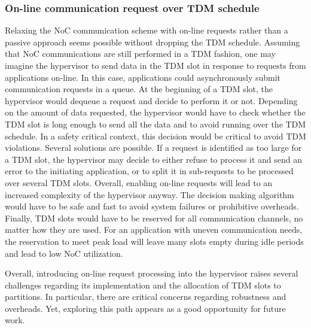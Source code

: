 \documentclass[main.tex]{subfiles}
\begin{document}
\subsubsection{On-line communication request over TDM schedule} Relaxing the
NoC communication scheme with on-line requests rather than a passive approach
seems possible without dropping the TDM schedule. Assuming that NoC
communications are still performed in a TDM fashion, one may imagine the
hypervisor to send data in the TDM slot in response to requests from
applications on-line. In this case, applications could asynchronously submit
communication requests in a queue. At the beginning of a TDM slot, the
hypervisor would dequeue a request and decide to perform it or not. Depending
on the amount of data requested, the hypervisor would have to check whether the
TDM slot is long enough to send all the data and to avoid running over the TDM
schedule. In a safety critical context, this decision would be critical to
avoid TDM violations. Several solutions are possible. If a request is
identified as too large for a TDM slot, the hypervisor may decide to either
refuse to process it and send an error to the initiating application, or to
split it in sub-requests to be processed over several TDM slots. Overall,
enabling on-line requests will lead to an increased complexity of the
hypervisor anyway. The decision making algorithm would have to be safe and fast
to avoid system failures or prohibitive overheads.  Finally, TDM slots would
have to be reserved for all communication channels, no matter how they are
used. For an application with uneven communication needs, the reservation to
meet peak load will leave many slots empty during idle periods and lead to low
NoC utilization.

Overall, introducing on-line request processing into the hypervisor raises
several challenges regarding its implementation and the allocation of TDM slots
to partitions. In particular, there are critical concerns regarding robustness
and overheads. Yet, exploring this path appears as a good opportunity for
future work.
\end{document}
